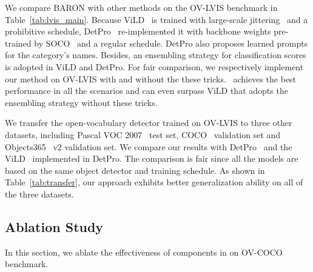 We compare BARON with other methods on the OV-LVIS benchmark in Table~\ref{tab:lvis_main}.
Because ViLD~\cite{gu2021open} is trained with large-scale jittering~\cite{simple_copy_paste} and a prohibitive  schedule, DetPro~\cite{Du_2022_CVPR} re-implemented it with backbone weights pre-trained by SOCO~\cite{wei2021aligning} and a regular  schedule.
DetPro also proposes learned prompts for the category's names. Besides, an ensembling strategy for classification scores is adopted in ViLD and DetPro. 
For fair comparison, we respectively implement our method on OV-LVIS with and without the these tricks. 
\method~achieves the best performance in all the scenarios and can even surpass ViLD that adopts the ensembling strategy without these tricks.


We transfer the open-vocabulary detector trained on OV-LVIS to three other datasets, including Pascal VOC 2007~\cite{everingham2010pascal} test set, COCO~\cite{lin2014microsoft} validation set and Objects365~\cite{shao2019objects365} v2 validation set. We compare our results with DetPro~\cite{Du_2022_CVPR} and the ViLD~\cite{gu2021open} implemented in DetPro. The comparison is fair since all the models are based on the same object detector and training schedule. 
As shown in Table~\ref{tab:transfer}, our approach exhibits better generalization ability on all of the three datasets.

\subsection{Ablation Study}
In this section, we ablate the effectiveness of components in \method on OV-COCO benchmark.


